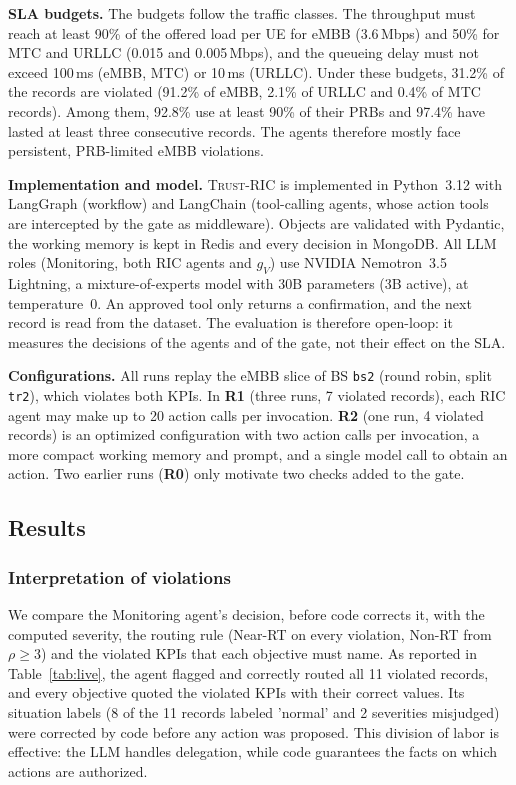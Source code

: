 \documentclass[conference]{IEEEtran}
\newcommand{\fw}{\textsc{Trust-RIC}}
\begin{document}
\noindent\textbf{SLA budgets.} The budgets follow the traffic classes. The
throughput must reach at least 90\% of the offered load per UE for eMBB
(3.6\,Mbps) and 50\% for MTC and URLLC (0.015 and 0.005\,Mbps), and the queueing
delay must not exceed 100\,ms (eMBB, MTC) or 10\,ms (URLLC). Under these
budgets, 31.2\% of the records are violated (91.2\% of eMBB, 2.1\% of URLLC and
0.4\% of MTC records). Among them, 92.8\% use at least 90\% of their PRBs and
97.4\% have lasted at least three consecutive records. The agents therefore
mostly face persistent, PRB-limited eMBB violations.

\noindent\textbf{Implementation and model.} \fw{} is implemented in Python~3.12
with LangGraph (workflow) and LangChain (tool-calling agents, whose action tools
are intercepted by the gate as middleware). Objects are validated with Pydantic,
the working memory is kept in Redis and every decision in MongoDB. All LLM roles
(Monitoring, both RIC agents and $g_V$) use NVIDIA Nemotron~3.5 Lightning, a
mixture-of-experts model with 30B parameters (3B active), at temperature~0. An
approved tool only returns a confirmation, and the next record is read from the
dataset. The evaluation is therefore open-loop: it measures the decisions of the
agents and of the gate, not their effect on the SLA.

\noindent\textbf{Configurations.} All runs replay the eMBB slice of BS
\texttt{bs2} (round robin, split \texttt{tr2}), which violates both KPIs. In
\textbf{R1} (three runs, 7 violated records), each RIC agent may make up to 20
action calls per invocation. \textbf{R2} (one run, 4 violated records) is an
optimized configuration with two action calls per invocation, a more compact
working memory and prompt, and a single model call to obtain an action. Two
earlier runs (\textbf{R0}) only motivate two checks added to the gate.



\subsection{Results}\label{sec:results}

\subsubsection{Interpretation of violations}
We compare the Monitoring agent's decision, before code corrects it, with the
computed severity, the routing rule (Near-RT on every violation, Non-RT from
$\rho\ge3$) and the violated KPIs that each objective must name. As reported in
Table~\ref{tab:live}, the agent flagged and correctly routed all 11 violated
records, and every objective quoted the violated KPIs with their correct values.
Its situation labels (8 of the 11 records labeled 'normal' and 2 severities misjudged) were corrected by code before any action was proposed. This division of labor is effective: the LLM handles delegation, while code guarantees the
facts on which actions are authorized.
\end{document}
